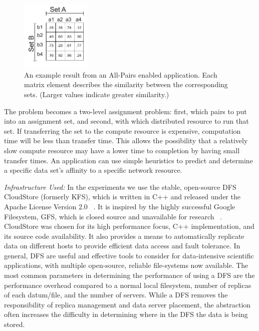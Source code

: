 \documentclass{rspublic}
\begin{document}
\begin{figure}[!ht]
 \begin{center}
     \includegraphics[width=0.3\textwidth]{data/allpairs-exp.pdf}
\end{center}
\caption{\small An example result from an All-Pairs enabled application.
Each matrix element describes the similarity between the corresponding
sets. (Larger values indicate greater similarity.)}
 \label{Fig:AllPairsExplanation}
\end{figure}

The problem becomes a two-level assignment problem: first, which pairs
to put into an assignment set, and second, with which distributed
resource to run that set. If transferring the set to the compute
resource is expensive, computation time will be less than transfer time.
This allows the possibility that a relatively slow compute resource may
have a lower time to completion by having small transfer times. An
application can use simple heuristics to predict and determine a
specific data set's affinity to a specific network resource.


{\it Infrastructure Used: } In the experiments we use the stable,
open-source DFS CloudStore (formerly KFS), which is written in C++ and
released under the Apache License Version 2.0 ~\citep{cloudstore_web}.
It is inspired by the highly successful Google Filesystem, GFS, which is
closed source and unavailable for research ~\citep{GFS}. CloudStore was
chosen for its high performance focus, C++ implementation, and its
source code availability. It also provides a means to automatically
replicate data on different hosts to provide efficient data access and
fault tolerance. In general, DFS are useful and effective tools to
consider for data-intensive scientific applications, with multiple
open-source, reliable file-systems now available. The most common
parameters in determining the performance of using a DFS are the
performance overhead compared to a normal local filesystem, number of
replicas of each datum/file, and the number of servers. While a DFS
removes the responsibility of replica management and data server
placement, the abstraction often increases the difficulty in determining
where in the DFS the data is being stored.
\end{document}
